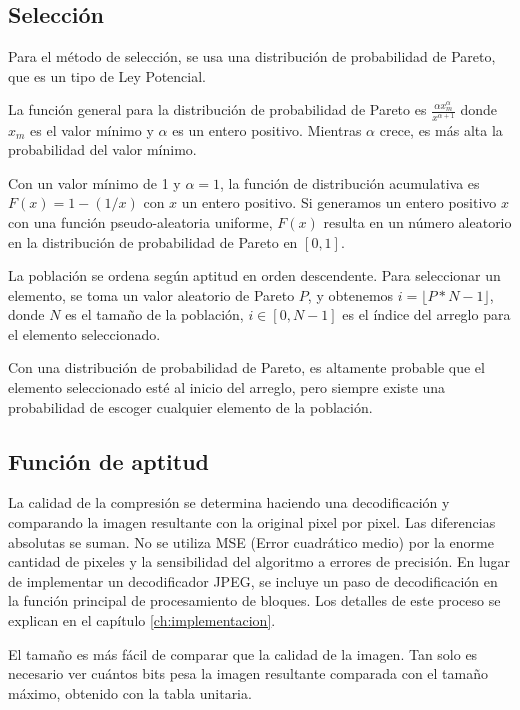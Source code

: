 \subsection{ Selección }

Para el método de selección, se usa una distribución de probabilidad de Pareto,
que es un tipo de Ley Potencial.

La función general para la distribución de probabilidad de Pareto es $\frac{
\alpha x_m^{\alpha} } { x^{\alpha + 1} }$ donde $x_m$ es el valor mínimo y
$\alpha$ es un entero positivo. Mientras $\alpha$ crece, es más alta la
probabilidad del valor mínimo.

Con un valor mínimo de 1 y $\alpha=1$, la función de distribución acumulativa
es $F(x) = 1 - (1/x)$ con $x$ un entero positivo. Si generamos un entero
positivo $x$ con una función pseudo-aleatoria uniforme, $F(x)$ resulta en un
número aleatorio en la distribución de probabilidad de Pareto en $[0, 1]$.

La población se ordena según aptitud en orden descendente. Para seleccionar un
elemento, se toma un valor aleatorio de Pareto $P$, y obtenemos $i = \lfloor P*N
- 1 \rfloor$, donde $N$ es el tamaño de la población, $i \in [0, N-1]$ es el índice del
arreglo para el elemento seleccionado.

Con una distribución de probabilidad de Pareto, es altamente probable que el elemento seleccionado esté al inicio del arreglo, pero siempre existe una probabilidad de escoger cualquier elemento de la población.

\subsection { Función de aptitud }

La calidad de la compresión se determina haciendo una decodificación y
comparando la imagen resultante con la original pixel por pixel. Las
diferencias absolutas se suman. No se utiliza MSE (Error cuadrático medio) por
la enorme cantidad de pixeles y la sensibilidad del algoritmo a errores de
precisión. En lugar de implementar un decodificador JPEG, se incluye un paso de
decodificación en la función principal de procesamiento de bloques. Los
detalles de este proceso se explican en el capítulo \ref{ch:implementacion}.

El tamaño es más fácil de comparar que la calidad de la imagen. Tan solo es
necesario ver cuántos bits pesa la imagen resultante comparada con el tamaño
máximo, obtenido con la tabla unitaria.

